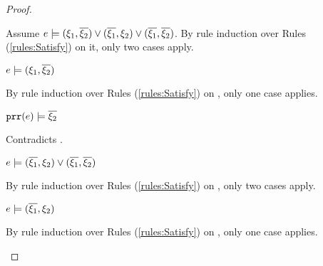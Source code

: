 \begin{proof}
\begin{byCases}
\begin{byCases}
\begin{byCases}
            Assume $e \models (\xi_1 , \overline{\xi_2}) \vee (\overline{\xi_1} , \xi_2) \vee (\overline{\xi_1} , \overline{\xi_2})$. By rule induction over Rules (\ref{rules:Satisfy}) on it, only two cases apply.
            \begin{byCases}
            \item[\text{(\ref{rule:CSOr1})}]
                \begin{pfsteps*}
                \item $e \models (\xi_1 , \overline{\xi_2})$  
                \end{pfsteps*}
                By rule induction over Rules (\ref{rules:Satisfy}) on , only one case applies.
                \begin{byCases}
                \item[\text{(\ref{rule:CSNotValPair})}]
                    \begin{pfsteps*}
                    \item $\mathtt{prr}(e) \models \overline{\xi_2}$ 
                    \end{pfsteps*}
                    Contradicts .
                \end{byCases}
            \item[\text{(\ref{rule:CSOr2})}]
                \begin{pfsteps*}
                \item $e \models (\overline{\xi_1} , \xi_2) \vee (\overline{\xi_1} , \overline{\xi_2})$  
                \end{pfsteps*}
                By rule induction over Rules (\ref{rules:Satisfy}) on , only two cases apply.
                \begin{byCases}
                \item[\text{(\ref{rule:CSOr1})}]
                    \begin{pfsteps*}
                    \item $e \models (\overline{\xi_1} , \xi_2)$  
                    \end{pfsteps*}
                    By rule induction over Rules (\ref{rules:Satisfy}) on , only one case applies.

\end{byCases}
\end{byCases}
\end{byCases}
\end{byCases}
\end{byCases}
\end{proof}

